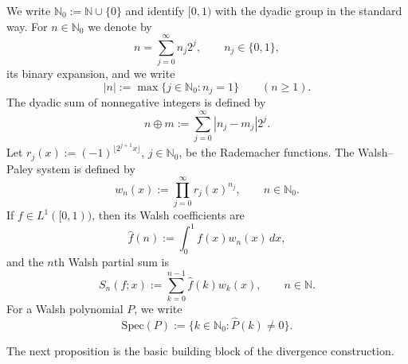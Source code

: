 \documentclass[11pt]{amsart}
\numberwithin{equation}{section}
\theoremstyle{plain}
\begin{document}
We write $\mathbb{N}_{0}:=\mathbb{N}\cup \{0\}$ and identify $[0,1)$ with
the dyadic group in the standard way. For $n\in \mathbb{N}_{0}$ we denote by 
\begin{equation}
n=\sum_{j=0}^{\infty }n_{j}2^{j},\qquad n_{j}\in \{0,1\},  \label{eq:binary}
\end{equation}%
its binary expansion, and we write 
\begin{equation*}
|n|:=\max \{j\in \mathbb{N}_{0}:n_{j}=1\}\qquad (n\geq 1).
\end{equation*}%
The dyadic sum of nonnegative integers is defined by 
\begin{equation*}
n\oplus m:=\sum_{j=0}^{\infty }|n_{j}-m_{j}|2^{j}.
\end{equation*}%
Let $r_{j}(x):=(-1)^{\lfloor 2^{j+1}x\rfloor }$, $j\in \mathbb{N}_{0}$, be
the Rademacher functions. The Walsh--Paley system is defined by 
\begin{equation*}
w_{n}(x):=\prod_{j=0}^{\infty }r_{j}(x)^{n_{j}},\qquad n\in \mathbb{N}_{0}.
\end{equation*}%
If $f\in L^{1}([0,1))$, then its Walsh coefficients are 
\begin{equation*}
\widehat{f}(n):=\int_{0}^{1}f(x)w_{n}(x)\,dx,
\end{equation*}%
and the $n$th Walsh partial sum is 
\begin{equation*}
S_{n}(f;x):=\sum_{k=0}^{n-1}\widehat{f}(k)w_{k}(x),\qquad n\in \mathbb{N}.
\end{equation*}%
For a Walsh polynomial $P$, we write 
\begin{equation*}
\mathrm{Spec}(P):=\{k\in \mathbb{N}_{0}:\widehat{P}(k)\neq 0\}.
\end{equation*}

The next proposition is the basic building block of the divergence
construction.
\end{document}
